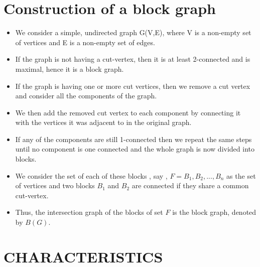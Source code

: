 \documentclass{memoir}
\begin{document}
\section*{Construction of a block graph}
\begin{itemize}
    \item We consider a simple, undirected graph G(V,E), where V is a non-empty set of vertices and E is a non-empty set of edges.
    \item If the graph is not having a cut-vertex, then it is at least 2-connected and is maximal, hence it is a block graph.
    \item If the graph is having one or more cut vertices, then we remove a cut vertex and consider all the components of the graph.
    \item We then add the removed cut vertex to each component by connecting it with the vertices it was adjacent to in the original graph.
    \item If any of the components are still 1-connected then we repeat the same steps until no component is one connected and the whole graph is now divided into blocks.
    \item We consider the set of each of these blocks , say , $F={B_1,B_2,...,B_n}$ as the set of vertices and two blocks $B_1$ and $B_2$ are connected if they share a common cut-vertex.
    \item Thus, the intersection graph of the blocks of set $F$ is the block graph, denoted by $B(G)$.
    
\end{itemize}

\section*{CHARACTERISTICS} %
\end{document}
